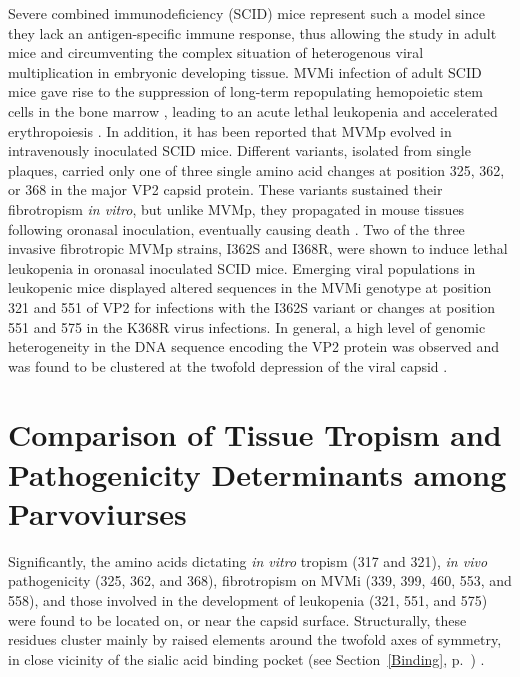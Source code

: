 Severe combined immunodeficiency (SCID) mice \cite{pmid6823332} represent such a model since they lack an antigen-specific immune response, thus allowing the study in adult mice and circumventing the complex situation of heterogenous viral multiplication in embryonic developing tissue. MVMi infection of adult SCID mice gave rise to the suppression of long-term repopulating hemopoietic stem cells in the bone marrow \cite{pmid12857918}, leading to an acute lethal leukopenia and accelerated erythropoiesis \cite{pmid9971754}.
In addition, it has been reported that MVMp evolved in intravenously inoculated SCID mice. Different variants, isolated from single plaques, carried only one of three single amino acid changes at position 325, 362, or 368 in the major VP2 capsid protein. These variants sustained their fibrotropism \textit{in vitro}, but unlike MVMp, they propagated in mouse tissues following oronasal inoculation, eventually causing death \cite{pmid16415031, pmid16103180}.
Two of the three invasive fibrotropic MVMp strains, I362S and I368R, were shown to induce lethal leukopenia in oronasal inoculated SCID mice. Emerging viral populations in leukopenic mice displayed altered sequences in the MVMi genotype at position 321 and 551 of VP2 for infections with the I362S variant or changes at position 551 and 575 in the K368R virus infections. In general, a high level of genomic heterogeneity in the DNA sequence encoding the VP2 protein was observed and was found to be clustered at the twofold depression of the viral capsid \cite{pmid18045943}.            	
	
	
\section{Comparison of Tissue Tropism and Pathogenicity Determinants among Parvoviurses}	
	
	Significantly, the amino acids dictating \textit{in vitro} tropism (317 and 321), \textit{in vivo} pathogenicity (325, 362, and 368), fibrotropism on MVMi (339, 399, 460, 553, and 558), and those involved in the development of leukopenia (321, 551, and 575) were found to be located on, or near the capsid surface. Structurally, these residues cluster mainly by raised elements around the twofold axes of symmetry, in close vicinity of the sialic acid binding pocket (see Section~\ref{Binding}, p.~\pageref{Binding}) \cite{pmid16415031, pmid18045943}.   
	
